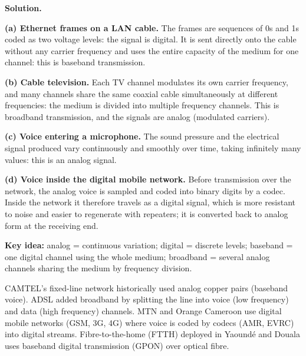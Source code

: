 \documentclass[11pt]{article}
\newcommand{\cle}[1]{{\popxbold\color{popdark}#1}}
\newcounter{popsec}
\newcounter{popsub}
\newcommand{\courssub}[1]{%
  \stepcounter{popsub}%
  \par\vspace{9pt}\noindent{\popxbold\fontsize{11.5}{13}\selectfont\color{popink}{\color{poporange}\thepopsec.\thepopsub}\hspace{6pt}#1}\par\nopagebreak\vspace{4pt}
}
\begin{document}
\begin{exoresolu}
\textbf{Solution.}

\textbf{(a) Ethernet frames on a LAN cable.} The frames are sequences of 0s and 1s coded as two voltage levels: the signal is \cle{digital}. It is sent directly onto the cable without any carrier frequency and uses the entire capacity of the medium for one channel: this is \cle{baseband} transmission.

\textbf{(b) Cable television.} Each TV channel modulates its own carrier frequency, and many channels share the same coaxial cable simultaneously at different frequencies: the medium is divided into multiple frequency channels. This is \cle{broadband} transmission, and the signals are \cle{analog} (modulated carriers).

\textbf{(c) Voice entering a microphone.} The sound pressure and the electrical signal produced vary continuously and smoothly over time, taking infinitely many values: this is an \cle{analog} signal.

\textbf{(d) Voice inside the digital mobile network.} Before transmission over the network, the analog voice is sampled and coded into binary digits by a codec. Inside the network it therefore travels as a \cle{digital} signal, which is more resistant to noise and easier to regenerate with repeaters; it is converted back to analog form at the receiving end.

\textbf{Key idea:} analog = continuous variation; digital = discrete levels; baseband = one digital channel using the whole medium; broadband = several analog channels sharing the medium by frequency division.
\end{exoresolu}

\begin{savaistu}
CAMTEL's fixed-line network historically used analog copper pairs (baseband voice). ADSL added broadband by splitting the line into voice (low frequency) and data (high frequency) channels. MTN and Orange Cameroon use digital mobile networks (GSM, 3G, 4G) where voice is coded by codecs (AMR, EVRC) into digital streams. Fibre-to-the-home (FTTH) deployed in Yaound\'e and Douala uses baseband digital transmission (GPON) over optical fibre.
\end{savaistu}

\courssub{Comprehensive Examination Problem}
\end{document}

